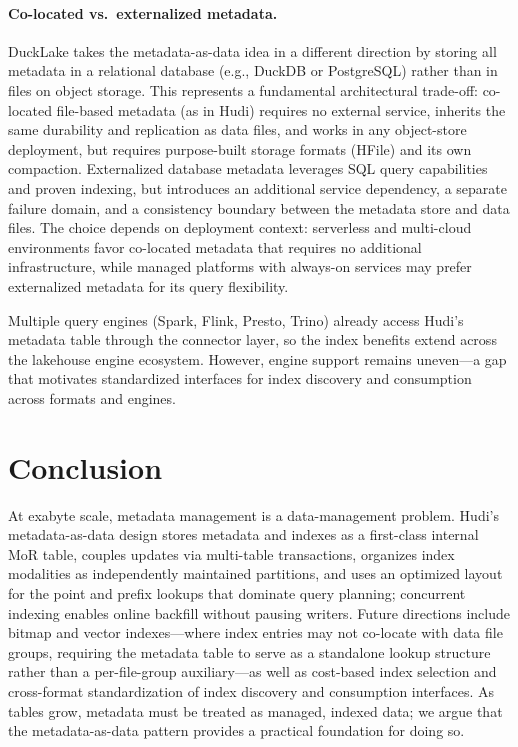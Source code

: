 \documentclass[sigconf]{acmart}
\begin{document}
\paragraph{Co-located vs.\ externalized metadata.}
DuckLake \cite{ducklake2025} takes the metadata-as-data idea in a different direction by storing all metadata in a relational database (e.g., DuckDB or PostgreSQL) rather than in files on object storage.
This represents a fundamental architectural trade-off: co-located file-based metadata (as in Hudi) requires no external service, inherits the same durability and replication as data files, and works in any object-store deployment, but requires purpose-built storage formats (HFile) and its own compaction.
Externalized database metadata leverages SQL query capabilities and proven indexing, but introduces an additional service dependency, a separate failure domain, and a consistency boundary between the metadata store and data files.
The choice depends on deployment context: serverless and multi-cloud environments favor co-located metadata that requires no additional infrastructure, while managed platforms with always-on services may prefer externalized metadata for its query flexibility.

Multiple query engines (Spark, Flink, Presto, Trino) already access Hudi's metadata table through the connector layer, so the index benefits extend across the lakehouse engine ecosystem.
However, engine support remains uneven---a gap that motivates standardized interfaces for index discovery and consumption across formats and engines.

\section{Conclusion}

At exabyte scale, metadata management is a data-management problem.
Hudi's metadata-as-data design stores metadata and indexes as a first-class internal MoR table, couples updates via multi-table transactions, organizes index modalities as independently maintained partitions, and uses an optimized layout for the point and prefix lookups that dominate query planning; concurrent indexing enables online backfill without pausing writers.
Future directions include bitmap and vector indexes---where index entries may not co-locate with data file groups, requiring the metadata table to serve as a standalone lookup structure rather than a per-file-group auxiliary---as well as cost-based index selection and cross-format standardization of index discovery and consumption interfaces.
As tables grow, metadata must be treated as managed, indexed data; we argue that the metadata-as-data pattern provides a practical foundation for doing so.



\end{document}

